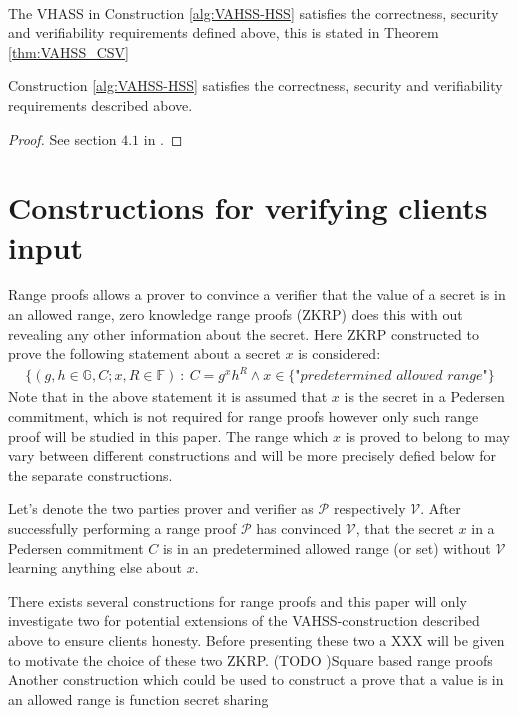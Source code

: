 \\
The VHASS in Construction \ref{alg:VAHSS-HSS} satisfies the correctness, security and verifiability requirements defined above, this is stated in Theorem \ref{thm:VAHSS_CSV} 
\\
\begin{thm}
\label{thm:VAHSS_CSV}
Construction \ref{alg:VAHSS-HSS} satisfies the correctness, security and verifiability requirements described above.
\end{thm}
\begin{proof}
See section $4.1$ in \cite{VAHSS}.
\end{proof}





\section{Constructions for verifying clients input}
\label{sec:RF_theory}
Range proofs allows a prover to convince a verifier that the value of a secret is in an allowed range, zero knowledge range proofs (ZKRP) does this with out revealing any other information about the secret. Here ZKRP constructed to prove the following statement about a secret $x$ is considered:
\begin{align*}
    \{(g,h\in\mathds{G},C;x,R\in\mathds{F})\::\:C= g^x h^R \wedge x \in \{\textit{"predetermined allowed range"}\}
\end{align*}
Note that in the above statement  it is assumed that $x$ is the secret in a Pedersen commitment, which is not required for range proofs however only such range proof will be studied in this paper. The range which $x$ is proved to belong to may vary between different constructions and will be more precisely defied below for the separate constructions. 

Let's denote the two parties prover and verifier as  $\mathcal{P}$ respectively $\mathcal{V}$. After successfully performing a range proof  $\mathcal{P}$ has convinced $\mathcal{V}$, that the secret $x$ in a Pedersen commitment $C$ is in an predetermined allowed range (or set) without $\mathcal{V}$ learning anything else about $x$.

There exists several constructions for range proofs and this paper will only investigate two for potential extensions of the VAHSS-construction described above to ensure clients honesty. Before presenting these two a XXX will be given to motivate the choice of these two ZKRP. (TODO )Square based range proofs \cite{Efficient_proof_interval} %
Another construction which could be used to construct a prove that a value is in an allowed range is function secret sharing \cite{FSS} %

